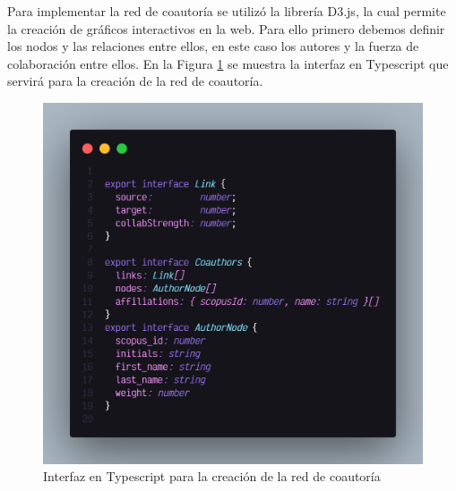 Para implementar la red de coautoría se utilizó la librería D3.js, la cual permite la creación de gráficos interactivos en la web.
Para ello primero debemos definir los nodos y las relaciones entre ellos, en este caso los autores y la fuerza de colaboración entre ellos.
En la Figura \ref{fig:network-interface-ts} se muestra la interfaz en Typescript que servirá para la creación de la red de coautoría.

\begin{figure}[H]
    \centering
    \includegraphics[scale=0.26]{../02Figures/02Chapter/Sprints/Sprint-2/coauthors-interface-typescript.png}
    \caption{Interfaz en Typescript para la creación de la red de coautoría}
    \label{fig:network-interface-ts}
\end{figure}

